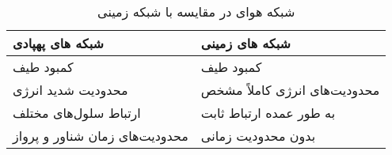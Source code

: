 \begin{table}[]\caption{شبکه هوای در مقایسه با شبکه زمینی}\label{Table4}
\begin{tabular}{ll}
	\hline
	شبکه های پهپادی & شبکه های زمینی \\ \hline
	کمبود طیف & کمبود طیف \\ 
	محدودیت شدید انرژی & محدودیت‌های انرژی کاملاً مشخص \\ 
	ارتباط سلول‌های مختلف & به طور عمده ارتباط ثابت \\ 
	محدودیت‌های زمان شناور و پرواز & بدون محدودیت زمانی  \\ \hline
	
\end{tabular}

\end{table}